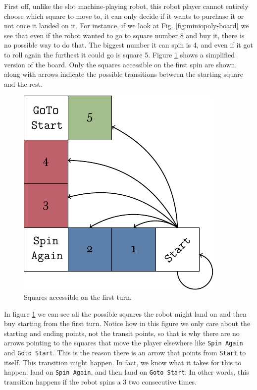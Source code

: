 First off, unlike the slot machine-playing robot, this robot 
player cannot entirely choose which square to move to, it can 
only decide if it wants to purchase it or not once it landed on 
it.  For instance, if we look at Fig. \ref{fig:miniopoly-board} 
we see that even if the robot wanted to go to square number 8 
and buy it, there is no possible way to do that. The biggest 
number it can spin is 4, and even if it got to roll again the 
furthest it could go is square 5. Figure 
\ref{fig:miniopoly-diagram-start} shows a simplified version of 
the board. Only the squares accessible on the first spin are 
shown, along with arrows indicate the possible transitions 
between the starting square and the rest.
\begin{figure}[h]
	\centering
	\includegraphics[width=.65\textwidth]{img/diagram-start.pdf}
	\caption{Squares accessible on the first turn.}
	\label{fig:miniopoly-diagram-start}
\end{figure}

In figure \ref{fig:miniopoly-diagram-start} we can see all the 
possible squares the robot might land on and then buy starting 
from the first turn. Notice how in this figure we only care 
about the starting and ending points, not the transit points, 
so that is why there are no arrows pointing to the squares that 
move the player elsewhere like \texttt{Spin Again} and 
\texttt{Goto Start}. This is the reason there is an arrow that 
points from \texttt{Start} to itself. This transition might 
happen. In fact, we know what it takes for this to happen: land 
on \texttt{Spin Again}, and then land on \texttt{Goto Start}. 
In other words, this transition happens if the robot spins a 3 
two consecutive times.

